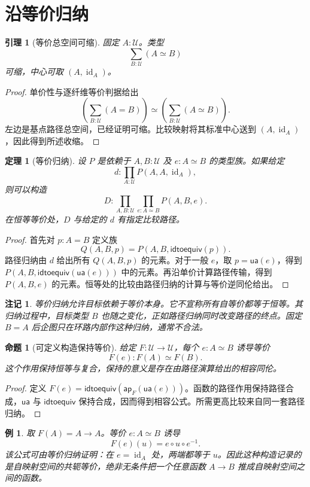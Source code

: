 \documentclass[12pt,oneside,openany,fontset=none]{ctexbook}
\theoremstyle{cn}
\newtheorem{example}[definition]{例}
\newtheorem{lemma}[definition]{引理}
\newtheorem{proposition}[definition]{命题}
\newtheorem{theorem}[definition]{定理}
\newtheorem{remark}[definition]{注记}
\numberwithin{equation}{chapter}
\newcommand{\U}{\mathcal U}
\newcommand{\id}{\operatorname{id}}
\newcommand{\ap}{\mathsf{ap}}
\newcommand{\ua}{\mathsf{ua}}
\newcommand{\idtoequiv}{\mathsf{idtoequiv}}
\begin{document}
\section{沿等价归纳}
\begin{lemma}[等价总空间可缩]
固定 $A:\U$。类型
\[
\sum_{B:\U}(A\simeq B)
\]
可缩，中心可取 $(A,\id_A)$。
\end{lemma}
\begin{proof}
单价性与逐纤维等价判据给出
\[
\left(\sum_{B:\U}(A=B)\right)
\simeq
\left(\sum_{B:\U}(A\simeq B)\right).
\]
左边是基点路径总空间，已经证明可缩。比较映射将其标准中心送到 $(A,\id_A)$，因此得到所述收缩。
\end{proof}
\begin{theorem}[等价归纳]
设 $P$ 是依赖于 $A,B:\U$ 及 $e:A\simeq B$ 的类型族。如果给定
\[
 d:\prod_{A:\U}P(A,A,\id_A),
\]
则可以构造
\[
 D:\prod_{A,B:\U}\prod_{e:A\simeq B}P(A,B,e).
\]
在恒等等价处，$D$ 与给定的 $d$ 有指定比较路径。
\end{theorem}
\begin{proof}
首先对 $p:A=B$ 定义族
\[
Q(A,B,p)=P(A,B,\idtoequiv(p)).
\]
路径归纳由 $d$ 给出所有 $Q(A,B,p)$ 的元素。对于一般 $e$，取 $p=\ua(e)$，得到 $P(A,B,\idtoequiv(\ua(e)))$ 中的元素。再沿单价计算路径传输，得到 $P(A,B,e)$ 的元素。恒等处的比较由路径归纳的计算与等价逆同伦给出。
\end{proof}
\begin{remark}
等价归纳允许目标依赖于等价本身。它不宣称所有自等价都等于恒等。其归纳过程中，目标类型 $B$ 也随之变化，正如路径归纳同时改变路径的终点。固定 $B=A$ 后企图只在环路内部作这种归纳，通常不合法。
\end{remark}
\begin{proposition}[可定义构造保持等价]
给定 $F:\U\to\U$，每个 $e:A\simeq B$ 诱导等价
\[
F(e):F(A)\simeq F(B).
\]
这个作用保持恒等与复合，保持的意义是存在由路径演算给出的相容同伦。
\end{proposition}
\begin{proof}
定义 $F(e)=\idtoequiv(\ap_F(\ua(e)))$。函数的路径作用保持路径合成，$\ua$ 与 $\idtoequiv$ 保持合成，因而得到相容公式。所需更高比较来自同一套路径归纳。
\end{proof}
\begin{example}
取 $F(A)=A\to A$。等价 $e:A\simeq B$ 诱导
\[
F(e)(u)=e\circ u\circ e^{-1}.
\]
该公式可由等价归纳证明：在 $e=\id_A$ 处，两端都等于 $u$。因此这种构造记录的是自映射空间的共轭等价，绝非无条件把一个任意函数 $A\to B$ 推成自映射空间之间的函数。
\end{example}
\end{document}
